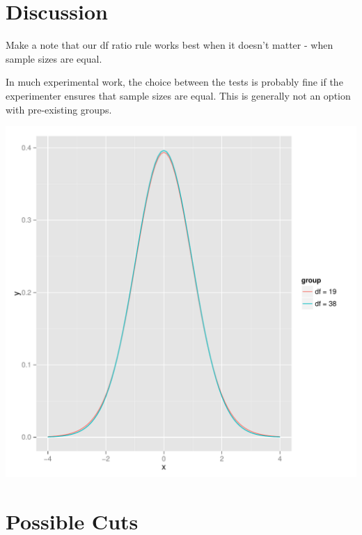 \documentclass[man,a4paper,noextraspace]{apa6}\usepackage[]{graphicx}\usepackage[]{color}
\makeatletter
\def\maxwidth{ %
  \ifdim\Gin@nat@width>\linewidth
    \linewidth
  \else
    \Gin@nat@width
  \fi
}
\newenvironment{knitrout}{}{} %
\makeatother
\begin{document}
\section{Discussion}
    Make a note that our df ratio rule works best when it doesn't matter - when sample sizes are equal.
    
    In much experimental work, the choice between the tests is probably fine if the experimenter ensures that sample sizes are equal. This is generally not an option with pre-existing groups. 

\begin{knitrout}
\color{fgcolor}
\includegraphics[width=\maxwidth]{figure/tdist} 

\end{knitrout}


\section{Possible Cuts}
\end{document}

